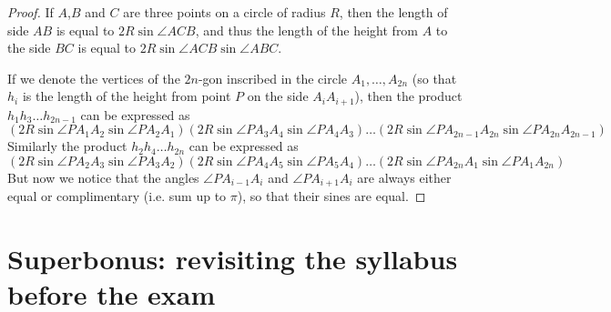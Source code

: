 \begin{proof}

If $A$,$B$ and $C$ are three points on a circle of radius $R$, then the length of side $AB$ is equal to $2R \sin \angle ACB$, and thus the length of the height from $A$ to the side $BC$ is equal to $2R \sin \angle ACB \sin \angle ABC$.

If we denote the vertices of the $2n$-gon inscribed in the circle $A_1,\ldots,A_{2n}$ (so that $h_i$ is the length of the height from point $P$ on the side $A_iA_{i+1}$), then the product $h_1 h_3 \ldots h_{2n-1}$ can be expressed as $$(2R \sin \angle PA_1A_2 \sin \angle PA_2A_1)(2R \sin \angle PA_3A_4 \sin \angle PA_4A_3)\ldots(2R \sin \angle PA_{2n-1}A_{2n} \sin \angle PA_{2n}A_{2n-1})$$ Similarly the product $h_2 h_4\ldots h_{2n}$ can be expressed as $$(2R \sin \angle PA_2A_3 \sin \angle PA_3A_2)(2R \sin \angle PA_4A_5 \sin \angle PA_5A_4)\ldots(2R \sin \angle PA_{2n}A_{1} \sin \angle PA_{1}A_{2n})$$ But now we notice that the angles $\angle PA_{i-1}A_i$ and $\angle PA_{i+1}A_i$ are always either equal or complimentary (i.e. sum up to $\pi$), so that their sines are equal.
\end{proof}

\section{Superbonus: revisiting the syllabus before the exam}


